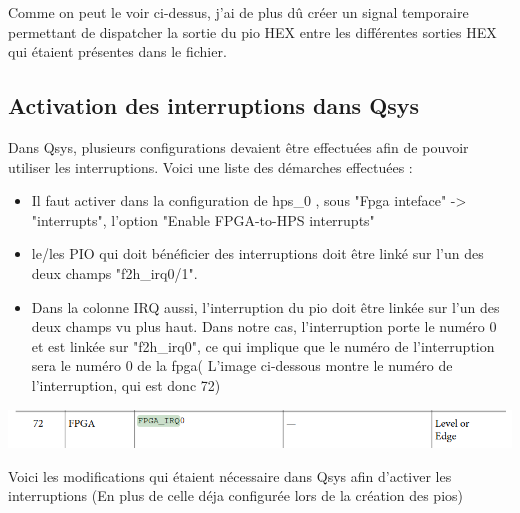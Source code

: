 Comme on peut le voir ci-dessus, j'ai de plus dû créer un signal temporaire permettant de dispatcher la sortie du pio HEX entre les différentes sorties HEX qui étaient présentes dans le fichier.

\subsection{Activation des interruptions dans Qsys}
Dans Qsys, plusieurs configurations devaient être effectuées afin de pouvoir utiliser les interruptions. Voici une liste des démarches effectuées : \\

\begin{itemize}
	\item Il faut activer dans la configuration de hps\_0 , sous "Fpga inteface" -> "interrupts", l'option "Enable FPGA-to-HPS interrupts"
	\item le/les PIO qui doit bénéficier des interruptions doit être linké sur l'un des deux champs "f2h\_irq0/1".
	\item Dans la colonne IRQ aussi, l'interruption du pio doit être linkée sur l'un des deux champs vu plus haut. Dans notre cas, l'interruption porte le numéro 0 et est linkée sur "f2h\_irq0", ce qui implique que le numéro de l'interruption sera le numéro 0 de la fpga( L'image ci-dessous montre le numéro de l'interruption, qui est donc 72)\\
\end{itemize}

\includegraphics[scale=0.5]{./images/fpga_irq0.png}

Voici les modifications qui étaient nécessaire dans Qsys afin d'activer les interruptions (En plus de celle déja configurée lors de la création des pios)

